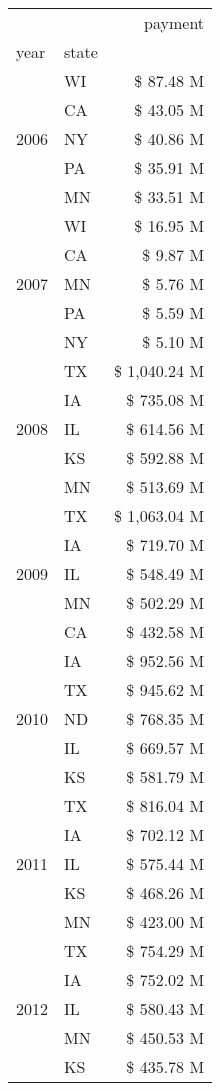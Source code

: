 \begin{longtable}{llr}
\toprule
 &  & payment \\
year & state &  \\
\midrule
\multirow[t]{5}{*}{2006} & WI & \$ 87.48 M \\
 & CA & \$ 43.05 M \\
 & NY & \$ 40.86 M \\
 & PA & \$ 35.91 M \\
 & MN & \$ 33.51 M \\
\cline{1-3}
\multirow[t]{5}{*}{2007} & WI & \$ 16.95 M \\
 & CA & \$ 9.87 M \\
 & MN & \$ 5.76 M \\
 & PA & \$ 5.59 M \\
 & NY & \$ 5.10 M \\
\cline{1-3}
\multirow[t]{5}{*}{2008} & TX & \$ 1,040.24 M \\
 & IA & \$ 735.08 M \\
 & IL & \$ 614.56 M \\
 & KS & \$ 592.88 M \\
 & MN & \$ 513.69 M \\
\cline{1-3}
\multirow[t]{5}{*}{2009} & TX & \$ 1,063.04 M \\
 & IA & \$ 719.70 M \\
 & IL & \$ 548.49 M \\
 & MN & \$ 502.29 M \\
 & CA & \$ 432.58 M \\
\cline{1-3}
\multirow[t]{5}{*}{2010} & IA & \$ 952.56 M \\
 & TX & \$ 945.62 M \\
 & ND & \$ 768.35 M \\
 & IL & \$ 669.57 M \\
 & KS & \$ 581.79 M \\
\cline{1-3}
\multirow[t]{5}{*}{2011} & TX & \$ 816.04 M \\
 & IA & \$ 702.12 M \\
 & IL & \$ 575.44 M \\
 & KS & \$ 468.26 M \\
 & MN & \$ 423.00 M \\
\cline{1-3}
\multirow[t]{5}{*}{2012} & TX & \$ 754.29 M \\
 & IA & \$ 752.02 M \\
 & IL & \$ 580.43 M \\
 & MN & \$ 450.53 M \\
 & KS & \$ 435.78 M \\

\end{longtable}
